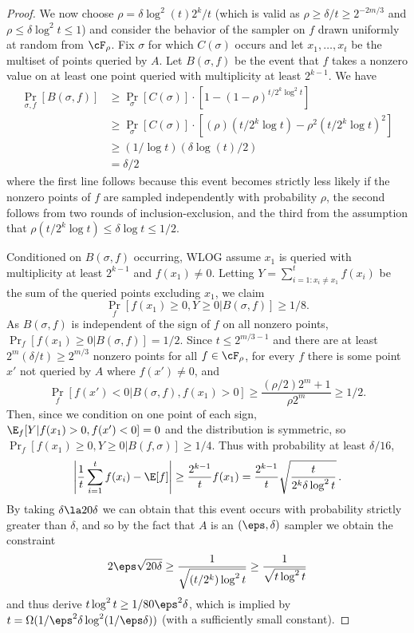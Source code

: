 \documentclass{toc}
\begin{document}
\begin{proof}
We now choose $\rho=\delta\log^2(t)2^k/t$ (which is valid as $\rho\geq \delta/t\geq 2^{-2m/3}$ and $\rho\leq \delta\log^2 t\leq 1$) and consider the behavior of the sampler on $f$ drawn uniformly at random from $\cF_\rho$. Fix $\sigma$ for which $C(\sigma)$ occurs and let $x_1,\ldots,x_t$ be the multiset of points queried by $A$. Let $B(\sigma,f)$ be the event that $f$ takes a nonzero value on at least one point queried with multiplicity at least $2^{k-1}$. We have
\begin{align*}
    \Pr_{\sigma,f}[B(\sigma,f)] &\geq \Pr_\sigma[C(\sigma)]\cdot \left[1-(1-\rho)^{t/2^k\log^2 t}\right]\\
    &\geq \Pr_\sigma[C(\sigma)]\cdot\left[(\rho)(t/2^k\log t)-\rho^2(t/2^k\log t)^2\right]\\
    &\geq (1/\log t)(\delta \log(t)/2)\\
    &= \delta/2%
\end{align*}
%
where %
the first line follows because this event becomes strictly less likely if the nonzero points of $f$ are sampled independently with probability $\rho$, the second follows from two rounds of inclusion-exclusion, and the third from the assumption that $\rho(t/2^k\log t)\leq \delta\log t\leq 1/2$. 

Conditioned on $B(\sigma,f)$ occurring, WLOG assume $x_1$ is queried with multiplicity at least $2^{k-1}$ and $f(x_1)\neq 0$. 
Letting $Y=\sum_{i=1:x_i\neq x_1}^tf(x_i)$ be the sum of the queried points excluding $x_1$, we claim
\[\Pr_{f}[f(x_1)\geq 0,Y\geq 0|B(\sigma,f)]\geq 1/8.\]
As $B(\sigma,f)$ is independent of the sign of $f$ on all nonzero points, $\Pr_f[f(x_1)\geq 0|B(\sigma,f)]=1/2$. Since $t \leq 2^{m/3-1}$ and there are at least $2^m(\delta/t)\geq 2^{m/3}$ nonzero points for all $f\in \cF_\rho$, for every $f$ there is some point $x'$ not queried by $A$ where $f(x')\neq 0$, and
\[\Pr_f[f(x')<0|B(\sigma,f),f(x_1)>0]\geq \frac{(\rho/2)2^m+1}{\rho 2^m}\geq 1/2.\]
Then, %
since we condition on one point of each sign, $\E_{f}[Y|f(x_1)>0,f(x')<0]=0$ and the distribution is symmetric, so $\Pr_{f}[f(x_1)\geq 0,Y\geq 0|B(f,\sigma)]\geq 1/4$. Thus with probability at least $\delta/16$,
\[\left|\frac{1}{t}\sum_{i=1}^tf(x_i)-\E[f]\right|\geq \frac{2^{k-1}}{t}f(x_1)=  \frac{2^{k-1}}{t}\sqrt{\frac{t}{2^k\delta\log^2t}}\,. \]  %
By taking $\delta\la 20\delta$ we can obtain that this event occurs with probability strictly greater than $\delta$, and so by the fact that $A$ is an $(\eps,\delta)$ sampler we obtain the constraint
\[2\eps\sqrt{20\delta} \geq \frac{1}{\sqrt{(t/2^k)\log^2t}} \geq \frac{1}{\sqrt{t\log^2 t}}\]
and thus derive $t\log^2 t\geq 1/80\eps^2\delta$, which is implied by $t=\Omega(1/\eps^2\delta\log^2(1/\eps\delta))$ (with a sufficiently small constant).
\end{proof}
\end{document}
